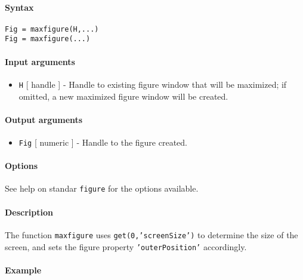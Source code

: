 


	\paragraph{Syntax}

\begin{verbatim}
Fig = maxfigure(H,...)
Fig = maxfigure(...)
\end{verbatim}

\paragraph{Input arguments}

\begin{itemize}
\itemsep1pt\parskip0pt
\item
  \texttt{H} {[} handle {]} - Handle to existing figure window that will
  be maximized; if omitted, a new maximized figure window will be
  created.
\end{itemize}

\paragraph{Output arguments}

\begin{itemize}
\itemsep1pt\parskip0pt
\item
  \texttt{Fig} {[} numeric {]} - Handle to the figure created.
\end{itemize}

\paragraph{Options}

See help on standar \texttt{figure} for the options available.

\paragraph{Description}

The function \texttt{maxfigure} uses \texttt{get(0,'screenSize')} to
determine the size of the screen, and sets the figure property
\texttt{'outerPosition'} accordingly.

\paragraph{Example}


